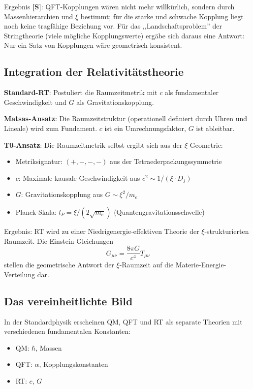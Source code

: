 	Ergebnis \textbf{[S]}: QFT-Kopplungen wären nicht mehr willkürlich, sondern durch Massenhierarchien und $\xi$ bestimmt; für die starke und schwache Kopplung liegt noch keine tragfähige Beziehung vor. Für das ,,Landschaftsproblem'' der Stringtheorie (viele mögliche Kopplungswerte) ergäbe sich daraus eine Antwort: Nur ein Satz von Kopplungen wäre geometrisch konsistent.
	
	\subsection{Integration der Relativitätstheorie}
	
	\textbf{Standard-RT}: Postuliert die Raumzeitmetrik mit $c$ als fundamentaler Geschwindigkeit und $G$ als Gravitationskopplung.
	
	\textbf{Matsas-Ansatz}: Die Raumzeitstruktur (operationell definiert durch Uhren und Lineale) wird zum Fundament. $c$ ist ein Umrechnungsfaktor, $G$ ist ableitbar.
	
	\textbf{T0-Ansatz}: Die Raumzeitmetrik selbst ergibt sich aus der $\xi$-Geometrie:
	\begin{itemize}
		\item Metriksignatur: $(+,-,-,-)$ aus der Tetraederpackungssymmetrie
		\item $c$: Maximale kausale Geschwindigkeit aus $c^2 \sim 1/(\xi \cdot D_f)$
		\item $G$: Gravitationskopplung aus $G \sim \xi^2 / m_e$
		\item Planck-Skala: $l_P = \xi/(2\sqrt{m_e})$ (Quantengravitationsschwelle)
	\end{itemize}
	
	Ergebnis: RT wird zu einer Niedrigenergie-effektiven Theorie der $\xi$-strukturierten Raumzeit. Die Einstein-Gleichungen
	\[
	G_{\mu\nu} = \frac{8\pi G}{c^4} T_{\mu\nu}
	\]
	stellen die geometrische Antwort der $\xi$-Raumzeit auf die Materie-Energie-Verteilung dar.
	
	\subsection{Das vereinheitlichte Bild}
	
	In der Standardphysik erscheinen QM, QFT und RT als separate Theorien mit verschiedenen fundamentalen Konstanten:
	\begin{itemize}
		\item QM: $\hbar$, Massen
		\item QFT: $\alpha$, Kopplungskonstanten
		\item RT: $c$, $G$
	\end{itemize}
	
